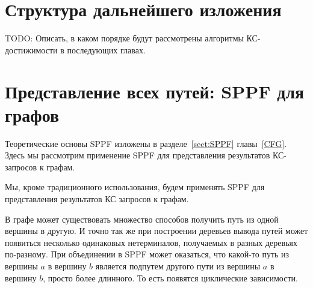 \section{Структура дальнейшего изложения}

TODO: Описать, в каком порядке будут рассмотрены алгоритмы КС-достижимости в последующих главах.

\section{Представление всех путей: SPPF для графов}

Теоретические основы SPPF изложены в разделе~\ref{sect:SPPF} главы~\ref{CFG}.
Здесь мы рассмотрим применение SPPF для представления результатов КС-запросов к графам.

Мы, кроме традиционного использования, будем применять SPPF для представления результатов КС запросов к графам.

В графе может существовать множество способов получить путь из одной вершины в другую. И точно так же при построении деревьев вывода путей может появиться несколько одинаковых нетерминалов, получаемых в разных деревьях по-разному. При объединении в SPPF может оказаться, что какой-то путь из вершины $a$ в вершину $b$ является подпутем другого пути из вершины $a$ в вершину $b$, просто более длинного. То есть появятся циклические зависимости.

